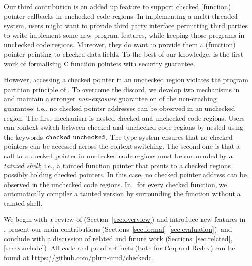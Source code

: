 Our third contribution is an added up feature
to support checked (function) pointer callbacks in unchecked code regions.
In implementing a multi-threaded system, users might want 
to provide third party interface permitting third parties 
to write implement some new program features, while keeping those programs in unchecked code regions.
Moreover, they do want to provide them a (function) pointer pointing to checked data fields.
To the best of our knowledge, \systemname is the first work of formalizing C function pointers with security guarantee.

However, accessing a checked pointer in an unchecked region violates the program partition principle of \systemname.
To overcome the discord, we develop two mechanisms in \systemname 
and maintain a stronger \textit{non-exposure} guarantee on of the non-crashing guarantee; 
i.e., no checked pointer addresses can be observed in an unchecked region.
The first mechanism is nested checked and unchecked code regions.
Users can context switch between checked and unchecked code regions 
by nested using the keywords $\mathtt{checked}$ $\mathtt{unchecked}$.
The type system ensures that no checked pointers can be accessed across the context switching.
The second one is that a call to a checked pointer in unchecked code regions 
must be surrounded by a \textit{tainted shell}; 
i.e., a tainted function pointer that points to a checked regions possibly holding checked pointers.
In this case, no checked pointer address can be observed in the unchecked code regions.
In \systemname, for every checked function, 
we automatically compiler a tainted version by surrounding the function without a tainted shell.

We begin with a review of \checkedc (Section~\ref{sec:overview}) and introduce new features in \systemname,
present our main contributions
(Sections~\ref{sec:formal}--\ref{sec:evaluation}), and conclude with a
discussion of 
related and future work (Sections~\ref{sec:related},
\ref{sec:conclude}). All code and proof artifacts (both for Coq and
Redex) can be found at \url{https://github.com/plum-umd/checkedc}. 



